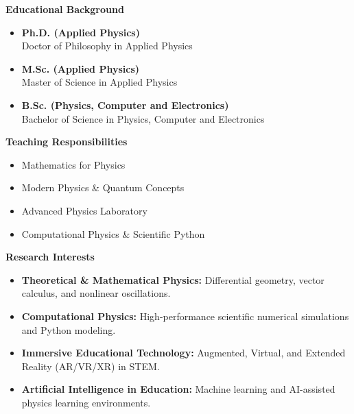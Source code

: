 \noindent
\begin{minipage}[t]{0.48\textwidth}
    {\fontsize{13}{16}\selectfont\bfseries\color{rbruGreen} Educational Background}\par\vspace{4pt}
    \begin{itemize}\setlength{\itemsep}{2pt}\setlength{\parsep}{0pt}\setlength{\topsep}{2pt}\setlength{\partopsep}{0pt}\setlength{\leftmargin}{12pt}
        \item \textbf{Ph.D. (Applied Physics)}\\Doctor of Philosophy in Applied Physics
        \item \textbf{M.Sc. (Applied Physics)}\\Master of Science in Applied Physics
        \item \textbf{B.Sc. (Physics, Computer and Electronics)}\\Bachelor of Science in Physics, Computer and Electronics
    \end{itemize}

    \vspace{0.35cm}
    {\fontsize{13}{16}\selectfont\bfseries\color{rbruGreen} Teaching Responsibilities}\par\vspace{4pt}
    \begin{itemize}\setlength{\itemsep}{2pt}\setlength{\parsep}{0pt}\setlength{\topsep}{2pt}\setlength{\partopsep}{0pt}\setlength{\leftmargin}{12pt}
        \item Mathematics for Physics
        \item Modern Physics \& Quantum Concepts
        \item Advanced Physics Laboratory
        \item Computational Physics \& Scientific Python
    \end{itemize}
\end{minipage}\hfill
\begin{minipage}[t]{0.48\textwidth}
    {\fontsize{13}{16}\selectfont\bfseries\color{rbruGreen} Research Interests}\par\vspace{4pt}
    \begin{itemize}\setlength{\itemsep}{3pt}\setlength{\parsep}{0pt}\setlength{\topsep}{2pt}\setlength{\partopsep}{0pt}\setlength{\leftmargin}{12pt}
        \item \textbf{Theoretical \& Mathematical Physics:} Differential geometry, vector calculus, and nonlinear oscillations.
        \item \textbf{Computational Physics:} High-performance scientific numerical simulations and Python modeling.
        \item \textbf{Immersive Educational Technology:} Augmented, Virtual, and Extended Reality (AR/VR/XR) in STEM.
        \item \textbf{Artificial Intelligence in Education:} Machine learning and AI-assisted physics learning environments.
    \end{itemize}
\end{minipage}
